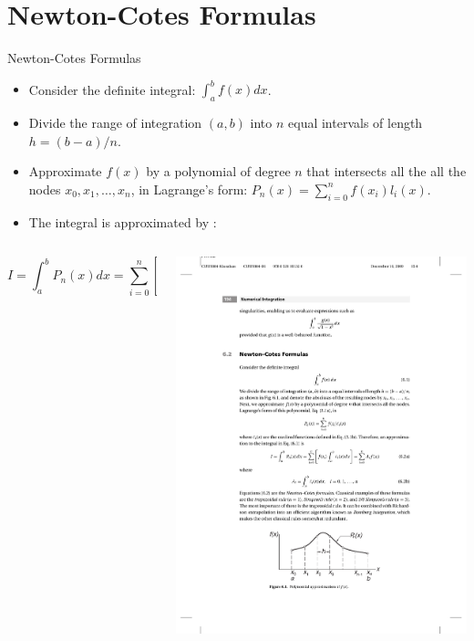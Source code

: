 \documentclass{beamer}
\newcommand{\beforeverb}{\footnotesize}
\newcommand{\afterverb}{\normalsize}
\begin{document}
\section[Newton-Cotes Formulas]{Newton-Cotes Formulas}
\begin{frame}{Newton-Cotes Formulas}

\begin{itemize}
\item Consider the definite integral: $
\int_a^b f(x) dx$.
\item Divide the range of integration $(a,b)$ into $n$ equal intervals of length $h=(b-a)/n$. 
\item Approximate $f(x)$ by a \alert{polynomial of degree $n$} that intersects all the all the nodes $x_0, x_1,\ldots, x_n$, in  Lagrange's form:
$P_n(x)=\sum_{i=0}^n f(x_i) l_i (x)$.
\item The integral is approximated by :
\end{itemize}
\begin{columns}
\begin{column}{0.6\textwidth}
\beforeverb
\[
I=\int_a^b P_n(x) dx =\sum_{i=0}^n \left[f(x_i) \int_a^b l_i (x) dx \right]=\sum_{i=0}^n A_i\, f(x_i)
\]
\afterverb
\end{column}
\begin{column}{0.4\textwidth}
\centerline{\includegraphics[width=\textwidth]{Lec12_Fig1}}
\end{column}
\end{columns}


\end{frame}
\end{document}

